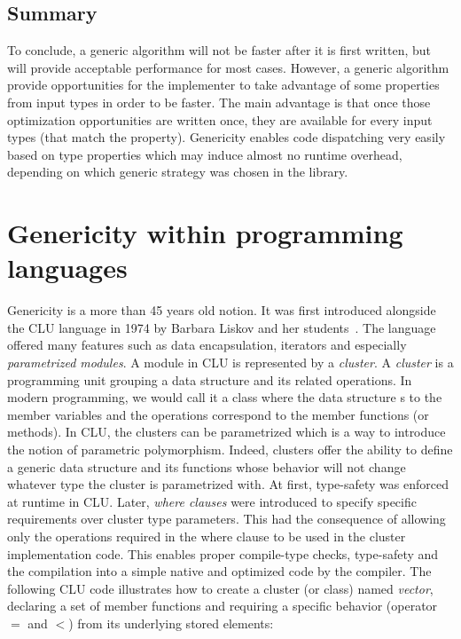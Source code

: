 \subsection{Summary}

To conclude, a generic algorithm will not be faster after it is first written, but will provide acceptable performance
for most cases. However, a generic algorithm provide opportunities for the implementer to take advantage of some
properties from input types in order to be faster. The main advantage is that once those optimization opportunities are
written once, they are available for every input types (that match the property). Genericity enables code dispatching
very easily based on type properties which may induce almost no runtime overhead, depending on which generic strategy was
chosen in the library.


\section{Genericity within programming languages}
\label{sec:gen.genericity.within.programming.languages}

Genericity is a more than 45 years old notion. It was first introduced alongside the CLU language in 1974 by Barbara
Liskov and her students~\parencite{liskov.1993.cluart}. The language offered many features such as data encapsulation,
iterators and especially \emph{parametrized modules}. A module in CLU is represented by a \emph{cluster}. A
\emph{cluster} is a programming unit grouping a data structure and its related operations. In modern programming, we
would call it a class where the data structure s to the member variables and the operations correspond to the member
functions (or methods). In CLU, the clusters can be parametrized which is a way to introduce the notion of parametric
polymorphism. Indeed, clusters offer the ability to define a generic data structure and its functions whose behavior
will not change whatever type the cluster is parametrized with. At first, type-safety was enforced at runtime in CLU.
Later, \emph{where clauses} were introduced to specify specific requirements over cluster type parameters. This had the
consequence of allowing only the operations required in the where clause to be used in the cluster implementation code.
This enables proper compile-type checks, type-safety and the compilation into a simple native and optimized code by the
compiler. The following CLU code illustrates how to create a cluster (or class) named \emph{vector}, declaring a set of
member functions and requiring a specific behavior (operator \(=\) and \(<\)) from its underlying stored elements:

